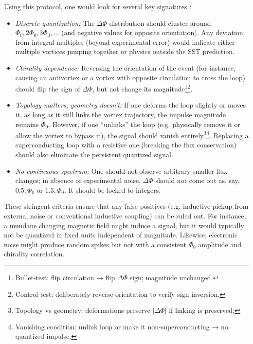 \documentclass[12pt]{article}
\begin{document}
Using this protocol, one would look for several key signatures \cite{Iskandarani2025FluxComp}:

\begin{itemize}

\item \emph{Discrete quantization:} The $\Delta\Phi$ distribution should cluster around $\Phi_{0}, 2\Phi_{0}, 3\Phi_{0},\dots$ (and negative values for opposite orientation). Any deviation from integral multiples (beyond experimental error) would indicate either multiple vortices jumping together or physics outside the SST prediction.

\item \emph{Chirality dependence:} Reversing the orientation of the event (for instance, causing an antivortex or a vortex with opposite circulation to cross the loop) should flip the sign of $\Delta\Phi$, but not change its magnitude\footnote{Bullet-test: flip circulation → flip $\Delta\Phi$ sign; magnitude unchanged.}\footnote{Control test: deliberately reverse orientation to verify sign inversion.}.

\item \emph{Topology matters, geometry doesn't:} If one deforms the loop slightly or moves it, as long as it still links the vortex trajectory, the impulse magnitude remains $\Phi_{0}$. However, if one ``unlinks'' the loop (e.g. physically remove it or allow the vortex to bypass it), the signal should vanish entirely\footnote{Topology vs geometry: deformations preserve $|\Delta\Phi|$ if linking is preserved.}\footnote{Vanishing condition: unlink loop or make it non-superconducting → no quantized impulse.}. Replacing a superconducting loop with a resistive one (breaking the flux conservation) should also eliminate the persistent quantized signal.

\item \emph{No continuous spectrum:} One should not observe arbitrary smaller flux changes; in absence of experimental noise, $\Delta\Phi$ should not come out as, say, $0.5,\Phi_{0}$ or $1.3,\Phi_{0}$. It should be locked to integers.

\end{itemize}




These stringent criteria ensure that any false positives (e.g. inductive pickup from external noise or conventional inductive coupling) can be ruled out. For instance, a mundane changing magnetic field might induce a signal, but it would typically not be quantized in fixed units independent of magnitude. Likewise, electronic noise might produce random spikes but not with a consistent $\Phi_{0}$ amplitude and chirality correlation.
\end{document}
